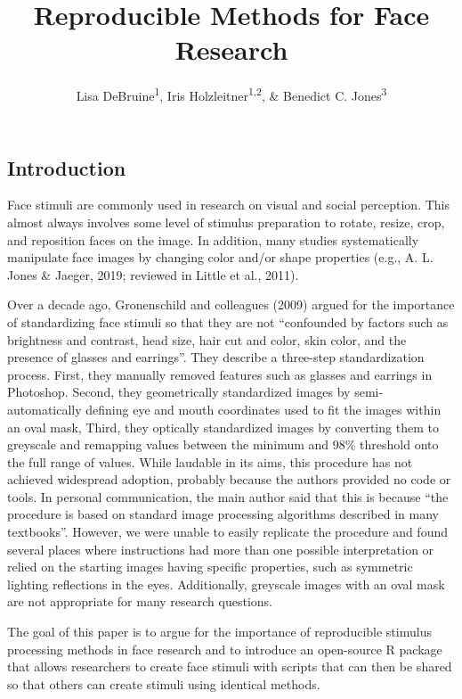 \documentclass[
  doc,floatsintext]{apa6}
\title{Reproducible Methods for Face Research}
\author{Lisa DeBruine\textsuperscript{1}, Iris Holzleitner\textsuperscript{1,2}, \& Benedict C. Jones\textsuperscript{3}}
\date{}
\affiliation{\vspace{0.5cm}\textsuperscript{1} Institute of Neuroscience \& Psychology, University of Glasgow\\\textsuperscript{2} University of the West of England, Bristol\\\textsuperscript{3} University of Strathclyde, Glasgow}
\begin{document}
\maketitle

\hypertarget{introduction}{%
\subsection{Introduction}\label{introduction}}

Face stimuli are commonly used in research on visual and social perception. This almost always involves some level of stimulus preparation to rotate, resize, crop, and reposition faces on the image. In addition, many studies systematically manipulate face images by changing color and/or shape properties (e.g., A. L. Jones \& Jaeger, 2019; reviewed in Little et al., 2011).

Over a decade ago, Gronenschild and colleagues (2009) argued for the importance of standardizing face stimuli so that they are not ``confounded by factors such as brightness and contrast, head size, hair cut and color, skin color, and the presence of glasses and earrings''. They describe a three-step standardization process. First, they manually removed features such as glasses and earrings in Photoshop. Second, they geometrically standardized images by semi-automatically defining eye and mouth coordinates used to fit the images within an oval mask, Third, they optically standardized images by converting them to greyscale and remapping values between the minimum and 98\% threshold onto the full range of values. While laudable in its aims, this procedure has not achieved widespread adoption, probably because the authors provided no code or tools. In personal communication, the main author said that this is because ``the procedure is based on standard image processing algorithms described in many textbooks''. However, we were unable to easily replicate the procedure and found several places where instructions had more than one possible interpretation or relied on the starting images having specific properties, such as symmetric lighting reflections in the eyes. Additionally, greyscale images with an oval mask are not appropriate for many research questions.

The goal of this paper is to argue for the importance of reproducible stimulus processing methods in face research and to introduce an open-source R package that allows researchers to create face stimuli with scripts that can then be shared so that others can create stimuli using identical methods.
\end{document}
